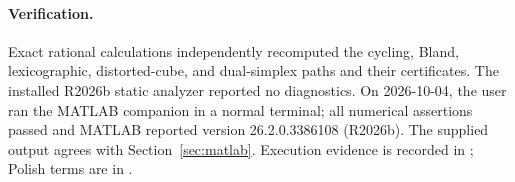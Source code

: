 \documentclass[11pt,a4paper]{article}
\begin{document}
\paragraph{Verification.}
Exact rational calculations independently recomputed the cycling, Bland,
lexicographic, distorted-cube, and dual-simplex paths and their certificates.
The installed R2026b static analyzer reported no diagnostics. On 2026-10-04,
the user ran the MATLAB companion in a normal terminal; all numerical assertions
passed and MATLAB reported version 26.2.0.3386108 (R2026b). The supplied output
agrees with Section~\ref{sec:matlab}. Execution evidence is recorded in
; Polish terms are in .
\endgroup
\end{document}
